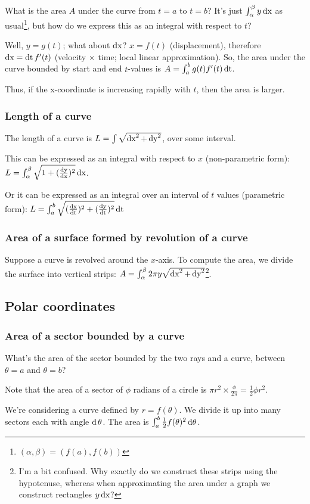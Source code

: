 \documentclass[12pt]{article}
\begin{document}
What is the area $A$ under the curve from $t=a$ to $t=b$? It's just
$\int_\alpha^\beta y \operatorname{\text{dx}}$ as usual\footnote{$(\alpha, \beta) = (f(a), f(b))$},
but how do we express this as an integral with respect to $t$?

Well, $y = g(t)$; what about $\operatorname{\text{dx}}$? $x = f(t)$ (displacement), therefore
$\operatorname{\text{dx}} = \operatorname{\text{dt}} f'(t)$ (velocity $\times$ time; local linear approximation). So, the
area under the curve bounded by start and end $t$-values is
$A = \int_a^b g(t) f'(t) \operatorname{\text{dt}}$.

Thus, if the x-coordinate is increasing rapidly with $t$, then the area is
larger.

\subsubsection*{Length of a curve}

The length of a curve is $L = \int \sqrt{\operatorname{\text{dx}}^2 + \operatorname{\text{dy}}^2}$, over some interval.

This can be expressed as an integral with respect to $x$ (non-parametric form):
$L = \int_\alpha^\beta \sqrt{1 + (\frac{\operatorname{\text{dy}}}{\operatorname{\text{dx}}})^2} \operatorname{\text{dx}}$.

Or it can be expressed as an integral over an interval of $t$ values (parametric form):
$L = \int_a^b \sqrt{ (\frac{\operatorname{\text{dx}}}{\operatorname{\text{dt}}})^2 + (\frac{\operatorname{\text{dy}}}{\operatorname{\text{dt}}})^2} \operatorname{\text{dt}}$

\subsubsection*{Area of a surface formed by revolution of a curve}

Suppose a curve is revolved around the $x$-axis. To compute the area, we divide the surface into vertical strips: $A = \int_\alpha^\beta 2\pi y \sqrt{\operatorname{\text{dx}}^2 + \operatorname{\text{dy}}^2}$\footnote{I'm a bit confused. Why exactly do we construct these strips using the hypotenuse, whereas when approximating the area under a graph we construct rectangles $y\operatorname{\text{dx}}$?}.


\subsection*{Polar coordinates}


\subsubsection*{Area of a sector bounded by a curve}

What's the area of the sector bounded by the two rays and a curve, between $\theta=a$ and $\theta=b$?

Note that the area of a sector of $\phi$ radians of a circle is $\pi r^2 \times \frac{\phi}{2\pi} = \frac{1}{2}\phi r^2$.

We're considering a curve defined by $r = f(\theta)$. We divide it up into many
sectors each with angle $\operatorname{\text{d}}\theta$. The area is
$\int_a^b \frac{1}{2}f(\theta)^2\operatorname{\text{d}\theta}$.
\end{document}
